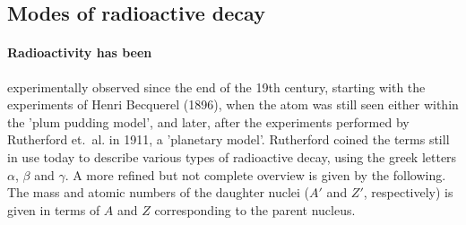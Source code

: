 \subsection{Modes of radioactive decay}
\paragraph{Radioactivity has been}
experimentally observed since the end of the 19th century, 
starting with the experiments of Henri Becquerel (1896), when the atom was still seen 
either within the 'plum pudding model', and later, after the experiments performed by 
Rutherford et.~al. in 1911, a 'planetary model'. Rutherford coined the terms still in 
use today to describe various types of radioactive decay, using the greek letters 
$\alpha$, $\beta$ and $\gamma$. A more refined but not complete overview is 
given by the following.~ \cite{martin2006nuclear}
The mass and atomic numbers of the daughter nuclei ($A'$ and $Z'$, respectively) 
is given in terms of $A$ and $Z$ corresponding to the parent nucleus. 
